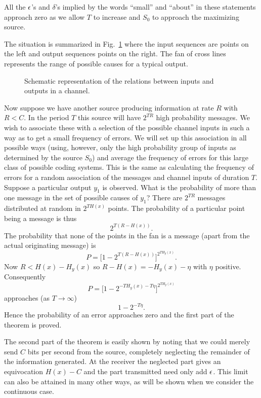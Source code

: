 All the $\epsilon$'s and $\delta$'s implied by the words ``small'' and
``about'' in these statements approach zero as we allow $T$ to increase
and $S_0$ to approach the maximizing source.

The situation is summarized in Fig.~\ref{fig:10} where the input sequences
are points on the left and output sequences points on the right.  The
fan of cross lines represents the range of possible causes for a typical
output.

\begin{figure}[ht]
\centerline{}
\caption{Schematic representation of the relations between inputs and
outputs in a channel.}
\label{fig:10}
\end{figure}

Now suppose we have another source producing
information at rate $R$ with $R<C$.  In the period $T$ this source will
have $2^{T R}$ high probability messages.  We wish to associate these with
a selection of the possible channel inputs in such a way as to get a small frequency of errors.  We
will set up this association in all possible ways (using,
however, only the high probability group of inputs as determined by
the source $S_0$) and average the frequency of errors for this large
class of possible coding systems.  This is the same as calculating the
frequency of errors for a random association of the messages and channel
inputs of duration $T$.  Suppose a particular output $y_1$ is observed.
What is the probability of more than one message
in the set
of possible causes of $y_1$?  There are $2^{T R}$ messages distributed
at random in $2^{TH(x)}$ points.  The probability of a particular point
being a message is thus
$$
2^{T(R-H(x))}.
$$
The probability that none of the points in the fan is a message (apart
from the actual originating message) is
$$
P = \bigl[1 - 2^{T(R-H(x))}\bigr]^{2^{T H_y(x)}}.
$$
Now $R < H(x) - H_y(x)$ so $R - H(x) = - H_y(x) - \eta$ with $\eta$
positive.  Consequently
$$
P = \bigl[ 1 - 2^{-T H_y(x) - T\eta} \bigr]^{2^{T H_y(x)}}
$$
approaches (as $T\to\infty$)
$$
1-2^{-T \eta}.
$$
Hence the probability of an error approaches zero and the first part of
the theorem is proved.

The second part of the theorem is easily shown by noting that we could
merely send $C$ bits per second from the source, completely neglecting the
remainder of the information generated.  At the receiver the neglected
part gives an equivocation $H(x)-C$ and the part transmitted need
only add $\epsilon$.  This limit can also be attained in many other ways,
as will be shown when we consider the continuous case.

